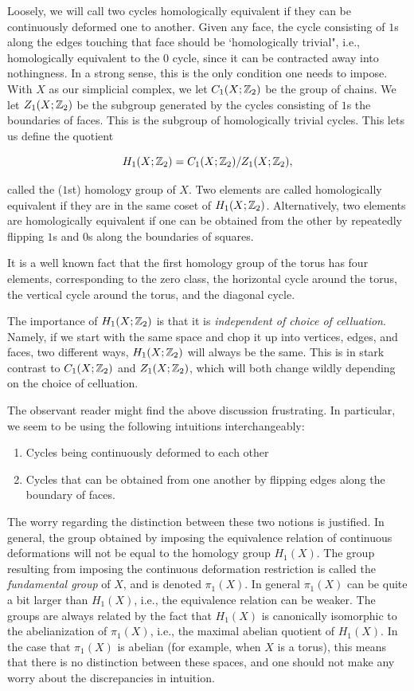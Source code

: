 \documentclass{article}
\theoremstyle{definition}
\numberwithin{figure}{section}
\begin{document}
Loosely, we will call two cycles homologically equivalent if they can be continuously deformed one to another. Given any face, the cycle consisting of $1$s along the edges touching that face should be `homologically trivial", i.e., homologically equivalent to the $0$ cycle, since it can be contracted away into nothingness. In a strong sense, this is the only condition one needs to impose. With $X$ as our simplicial complex, we let $C_1(X;\mathbb{Z}_2)$ be the group of chains. We let $Z_1(X;\mathbb{Z}_2)$ be the subgroup generated by the cycles consisting of $1$s  the boundaries of faces. This is the subgroup of homologically trivial cycles. This lets us define the quotient

$$H_1(X;\mathbb{Z}_2)=C_1(X;\mathbb{Z}_2)/Z_1(X;\mathbb{Z}_2),$$

called the ($1$st) homology group of $X$. Two elements are called homologically equivalent if they are in the same coset of $H_1(X;\mathbb{Z}_2)$. Alternatively, two elements are homologically equivalent if one can be obtained from the other by repeatedly flipping $1$s and $0$s along the boundaries of squares.

It is a well known fact that the first homology group of the torus has four elements, corresponding to the zero class, the horizontal cycle around the torus, the vertical cycle around the torus, and the diagonal cycle.

The importance of $H_1(X;\mathbb{Z}_2)$ is that it is \textit{independent of choice of celluation}. Namely, if we start with the same space and chop it up into vertices, edges, and faces, two different ways, $H_1(X;\mathbb{Z}_2)$ will always be the same. This is in stark contrast to $C_1(X;\mathbb{Z}_2)$ and $Z_1(X;\mathbb{Z}_2)$, which will both change wildly depending on the choice of celluation.

The observant reader might find the above discussion frustrating. In particular, we seem to be using the following intuitions interchangeably:

\begin{enumerate}
\item Cycles being continuously deformed to each other
\item Cycles that can be obtained from one another by flipping edges along the boundary of faces.
\end{enumerate}

The worry regarding the distinction between these two notions is justified. In general, the group obtained by imposing the equivalence relation of continuous deformations will not be equal to the homology group $H_1(X)$. The group resulting from imposing the continuous deformation restriction is called the \textit{fundamental group} of $X$, and is denoted $\pi_1(X)$. In general $\pi_1(X)$ can be quite a bit larger than $H_1(X)$, i.e., the equivalence relation can be weaker. The groups are always related by the fact that $H_1(X)$ is canonically isomorphic to the abelianization of $\pi_1(X)$, i.e., the maximal abelian quotient of $H_1(X)$. In the case that $\pi_1(X)$ is abelian (for example, when $X$ is a torus), this means that there is no distinction between these spaces, and one should not make any worry about the discrepancies in intuition.
\end{document}
